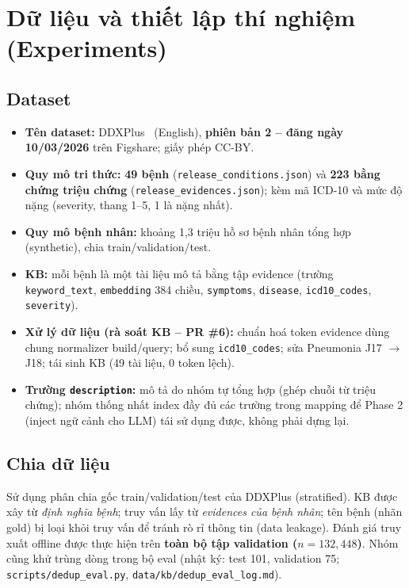 \section{Dữ liệu và thiết lập thí nghiệm (Experiments)}
\subsection{Dataset}
\begin{itemize}
    \item \textbf{Tên dataset:} DDXPlus~\cite{ddxplus2022} (English), \textbf{phiên bản 2 -- đăng ngày 10/03/2026} trên Figshare; giấy phép CC-BY.
    \item \textbf{Quy mô tri thức:} \textbf{49 bệnh} (\texttt{release\_conditions.json}) và \textbf{223 bằng chứng triệu chứng} (\texttt{release\_evidences.json}); kèm mã ICD-10 và mức độ nặng (severity, thang 1--5, 1 là nặng nhất).
    \item \textbf{Quy mô bệnh nhân:} khoảng 1,3 triệu hồ sơ bệnh nhân tổng hợp (synthetic), chia train/validation/test.
    \item \textbf{KB:} mỗi bệnh là một tài liệu mô tả bằng tập evidence (trường \texttt{keyword\_text}, \texttt{embedding} 384 chiều, \texttt{symptoms}, \texttt{disease}, \texttt{icd10\_codes}, \texttt{severity}).
    \item \textbf{Xử lý dữ liệu (rà soát KB -- PR \#6):} chuẩn hoá token evidence dùng chung normalizer build/query; bổ sung \texttt{icd10\_codes}; sửa Pneumonia J17 $\rightarrow$ J18; tái sinh KB (49 tài liệu, 0 token lệch).
    \item \textbf{Trường \texttt{description}:} mô tả do nhóm tự tổng hợp (ghép chuỗi từ triệu chứng); nhóm thống nhất index đầy đủ các trường trong mapping để Phase 2 (inject ngữ cảnh cho LLM) tái sử dụng được, không phải dựng lại.
\end{itemize}

\subsection{Chia dữ liệu}
Sử dụng phân chia gốc train/validation/test của DDXPlus (stratified). KB được xây từ \textit{định nghĩa bệnh}; truy vấn lấy từ \textit{evidences của bệnh nhân}; tên bệnh (nhãn gold) bị loại khỏi truy vấn để tránh rò rỉ thông tin (data leakage). Đánh giá truy xuất offline được thực hiện trên \textbf{toàn bộ tập validation ($n=132{,}448$)}. Nhóm cũng khử trùng dòng trong bộ eval (nhật ký: test 101, validation 75; \texttt{scripts/dedup\_eval.py}, \texttt{data/kb/dedup\_eval\_log.md}).

